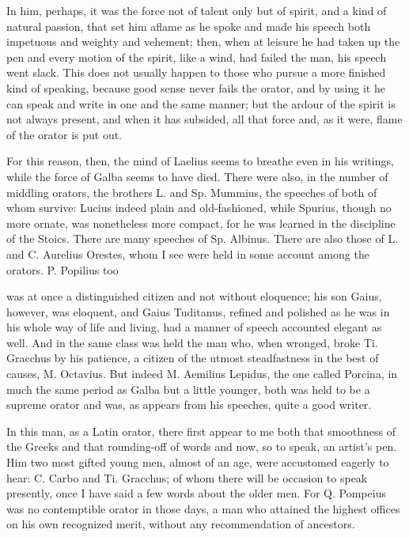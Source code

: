  In him, perhaps, it was the force not of talent only but of spirit, and a kind of natural passion, that set him aflame as he spoke and made his speech both impetuous and weighty and vehement; then, when at leisure he had taken up the pen and every motion of the spirit, like a wind, had failed the man, his speech went slack. This does not usually happen to those who pursue a more finished kind of speaking, because good sense never fails the orator, and by using it he can speak and write in one and the same manner; but the ardour of the spirit is not always present, and when it has subsided, all that force and, as it were, flame of the orator is put out.

 For this reason, then, the mind of Laelius seems to breathe even in his writings, while the force of Galba seems to have died. There were also, in the number of middling orators, the brothers L. and Sp. Mummius, the speeches of both of whom survive: Lucius indeed plain and old-fashioned, while Spurius, though no more ornate, was nonetheless more compact, for he was learned in the discipline of the Stoics. There are many speeches of Sp. Albinus. There are also those of L. and C. Aurelius Orestes, whom I see were held in some account among the orators. P. Popilius too

 was at once a distinguished citizen and not without eloquence; his son Gaius, however, was eloquent, and Gaius Tuditanus, refined and polished as he was in his whole way of life and living, had a manner of speech accounted elegant as well. And in the same class was held the man who, when wronged, broke Ti. Gracchus by his patience, a citizen of the utmost steadfastness in the best of causes, M. Octavius. But indeed M. Aemilius Lepidus, the one called Porcina, in much the same period as Galba but a little younger, both was held to be a supreme orator and was, as appears from his speeches, quite a good writer.

 In this man, as a Latin orator, there first appear to me both that smoothness of the Greeks and that rounding-off of words and now, so to speak, an artist's pen. Him two most gifted young men, almost of an age, were accustomed eagerly to hear: C. Carbo and Ti. Gracchus; of whom there will be occasion to speak presently, once I have said a few words about the older men. For Q. Pompeius was no contemptible orator in those days, a man who attained the highest offices on his own recognized merit, without any recommendation of ancestors.

